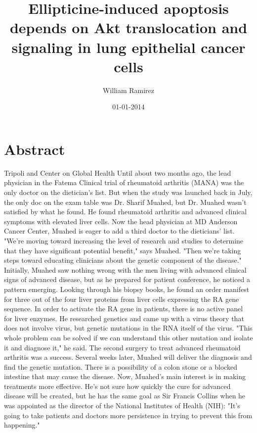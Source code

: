 \documentclass{article}%
\title{Ellipticine{-}induced apoptosis depends on Akt translocation and signaling in lung epithelial cancer cells}%
\author{William Ramirez}%
\affil{Advanced Laboratory for Plant Genetic Engineering, Advanced Technology Development Centre, Indian Institute of Technology Kharagpur, Kharagpur, India}%
\date{01{-}01{-}2014}%
\begin{document}
%
\normalsize%
\maketitle%
\section{Abstract}%
\label{sec:Abstract}%
Tripoli and Center on Global Health\newline%
Until about two months ago, the lead physician in the Fatema Clinical trial of rheumatoid arthritis (MANA) was the only doctor on the dietician's list. But when the study was launched back in July, the only doc on the exam table was Dr. Sharif Muahed, but Dr. Muahed wasn't satisfied by what he found. He found rheumatoid arthritis and advanced clinical symptoms with elevated liver cells. Now the head physician at MD Anderson Cancer Center, Muahed is eager to add a third doctor to the dieticians' list.\newline%
"We're moving toward increasing the level of research and studies to determine that they have significant potential benefit," says Muahed. "Then we're taking steps toward educating clinicians about the genetic component of the disease."\newline%
Initially, Muahed saw nothing wrong with the men living with advanced clinical signs of advanced disease, but as he prepared for patient conference, he noticed a pattern emerging. Looking through his biopsy books, he found an order manifest for three out of the four liver proteins from liver cells expressing the RA gene sequence. In order to activate the RA gene in patients, there is no active panel for liver enzymes. He researched genetics and came up with a virus theory that does not involve virus, but genetic mutations in the RNA itself of the virus.\newline%
"This whole problem can be solved if we can understand this other mutation and isolate it and diagnose it," he said.\newline%
The second surgery to treat advanced rheumatoid arthritis was a success. Several weeks later, Muahed will deliver the diagnosis and find the genetic mutation. There is a possibility of a colon stone or a blocked intestine that may cause the disease. Now, Muahed's main interest is in making treatments more effective. He's not sure how quickly the cure for advanced disease will be created, but he has the same goal as Sir Francis Collins when he was appointed as the director of the National Institutes of Health (NIH): "It's going to take patients and doctors more persistence in trying to prevent this from happening."
\end{document}
